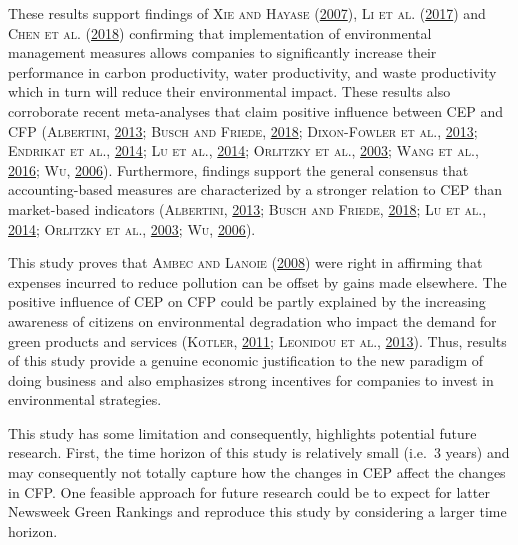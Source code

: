 \documentclass[12pt,]{article}
\begin{document}
These results support findings of \textsc{Xie and Hayase}
(\protect\hyperlink{ref-Xie2007}{2007}), \textsc{Li et al.}
(\protect\hyperlink{ref-Li2017}{2017}) and \textsc{Chen et al.}
(\protect\hyperlink{ref-Chencrosscountrycomparisongreen2018}{2018})
confirming that implementation of environmental management measures
allows companies to significantly increase their performance in carbon
productivity, water productivity, and waste productivity which in turn
will reduce their environmental impact. These results also corroborate
recent meta-analyses that claim positive influence between CEP and CFP
(\textsc{Albertini}, \protect\hyperlink{ref-Albertini2013}{2013};
\textsc{Busch and Friede}, \protect\hyperlink{ref-Busch2018}{2018};
\textsc{Dixon-Fowler et al.},
\protect\hyperlink{ref-Dixon-Fowler2013}{2013}; \textsc{Endrikat et
al.}, \protect\hyperlink{ref-EndrikatMakingsenseconflicting2014}{2014};
\textsc{Lu et al.},
\protect\hyperlink{ref-Ludecadedebatenexus2014}{2014}; \textsc{Orlitzky
et al.}, \protect\hyperlink{ref-Orlitzky2003}{2003}; \textsc{Wang et
al.}, \protect\hyperlink{ref-WangMetaAnalyticReviewCorporate2016}{2016};
\textsc{Wu}, \protect\hyperlink{ref-Wu2006}{2006}). Furthermore,
findings support the general consensus that accounting-based measures
are characterized by a stronger relation to CEP than market-based
indicators (\textsc{Albertini},
\protect\hyperlink{ref-Albertini2013}{2013}; \textsc{Busch and Friede},
\protect\hyperlink{ref-Busch2018}{2018}; \textsc{Lu et al.},
\protect\hyperlink{ref-Ludecadedebatenexus2014}{2014}; \textsc{Orlitzky
et al.}, \protect\hyperlink{ref-Orlitzky2003}{2003}; \textsc{Wu},
\protect\hyperlink{ref-Wu2006}{2006}).

This study proves that \textsc{Ambec and Lanoie}
(\protect\hyperlink{ref-Ambec2008}{2008}) were right in affirming that
expenses incurred to reduce pollution can be offset by gains made
elsewhere. The positive influence of CEP on CFP could be partly
explained by the increasing awareness of citizens on environmental
degradation who impact the demand for green products and services
(\textsc{Kotler}, \protect\hyperlink{ref-Kotler2011}{2011};
\textsc{Leonidou et al.}, \protect\hyperlink{ref-Leonidou2013}{2013}).
Thus, results of this study provide a genuine economic justification to
the new paradigm of doing business and also emphasizes strong incentives
for companies to invest in environmental strategies.

This study has some limitation and consequently, highlights potential
future research. First, the time horizon of this study is relatively
small (i.e.~3 years) and may consequently not totally capture how the
changes in CEP affect the changes in CFP. One feasible approach for
future research could be to expect for latter Newsweek Green Rankings
and reproduce this study by considering a larger time horizon.
\end{document}
